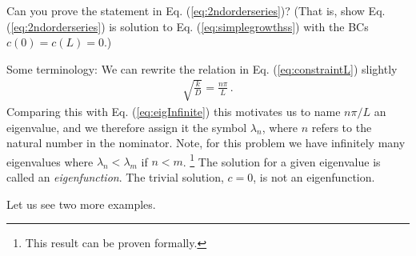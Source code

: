 \begin{question}
	Can you prove the statement in Eq. (\ref{eq:2ndorderseries})? (That is, show
	Eq. (\ref{eq:2ndorderseries}) is solution to Eq. (\ref{eq:simplegrowthss})
	with the BCs $c(0)=c(L)=0$.)
\end{question}

Some terminology: We can rewrite the relation in Eq. (\ref{eq:constraintL}) slightly 
\begin{eqnarray}
	\sqrt{\frac{k}{D}} = \frac{n\pi}{L} \, .
\end{eqnarray}
Comparing this with Eq. (\ref{eq:eigInfinite}) this motivates 
us to name $n\pi/L$ an eigenvalue, and we therefore assign it the symbol
$\lambda_n$, where $n$ refers to the natural number in the nominator. 
Note, for this problem we have infinitely many eigenvalues where $\lambda_n < \lambda_m$ 
if $n<m$. \footnote{This result can be proven formally.} The solution for a given 
eigenvalue is called an \emph{eigenfunction}. The trivial solution, $c=0$, is not an eigenfunction. 

Let us see two more examples.

